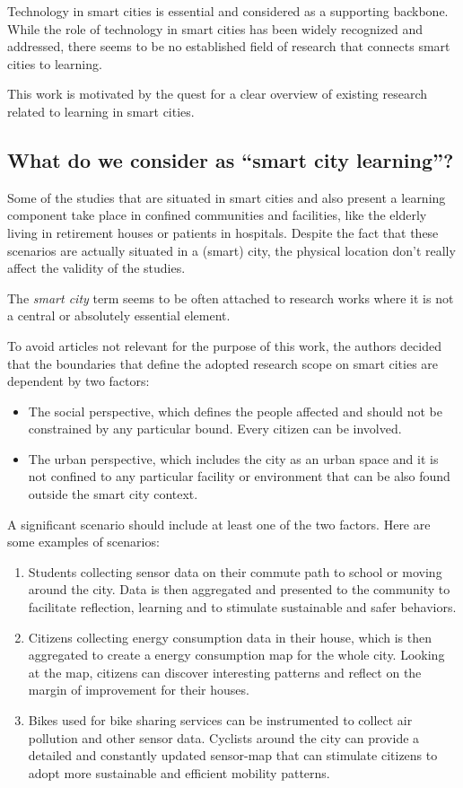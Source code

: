 Technology in smart cities is essential and considered as a supporting backbone\cite{giovannella_smart_2014}.
While the role of technology in smart cities has been widely recognized and addressed, there seems to be no established field of research that connects smart cities to learning.

This work is motivated by the quest for a clear overview of existing research related to learning in smart cities.


\subsection{What do we consider as ``smart city learning''?} \label{subsec:definition}
Some of the studies that are situated in smart cities and also present a learning component take place in confined communities and facilities, like the elderly living in retirement houses or patients in hospitals. Despite the fact that these scenarios are actually situated in a (smart) city, the physical location don't really affect the validity of the studies.

The \textit{smart city} term seems to be often attached to research works where it is not a central or absolutely essential element.

To avoid articles not relevant for the purpose of this work, the authors decided that the boundaries that define the adopted research scope on smart cities are dependent by two factors:

\begin{itemize}
\item The social perspective, which defines the people affected and should not be constrained by any particular bound. Every citizen can be involved.
\item The urban perspective, which includes the city as an urban space and it is not confined to any particular facility or environment that can be also found outside the smart city context.
\end{itemize}

A significant scenario should include at least one of the two factors. Here are some examples of scenarios:

\begin{enumerate}
\item Students collecting sensor data on their commute path to school or moving around the city. Data is then aggregated and presented to the community to facilitate reflection, learning and to stimulate sustainable and safer behaviors.
\item Citizens collecting energy consumption data in their house, which is then aggregated to create a energy consumption map for the whole city. Looking at the map, citizens can discover interesting patterns and reflect on the margin of improvement for their houses.
\item Bikes used for bike sharing services can be instrumented to collect air pollution and other sensor data. Cyclists around the city can provide a detailed and constantly updated sensor-map that can stimulate citizens to adopt more sustainable and efficient mobility patterns.
\end{enumerate}

